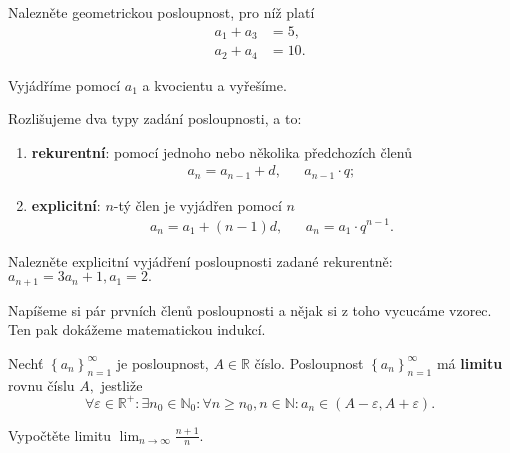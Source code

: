 \begin{priklad}
Nalezněte geometrickou posloupnost, pro níž platí
\begin{align*}
    a_1+a_3 &=5,\\
    a_2+a_4 &= 10.
\end{align*}
\end{priklad}

\begin{reseni}
Vyjádříme pomocí $a_1$ a kvocientu a vyřešíme.
\end{reseni}

\begin{pozn}
    Rozlišujeme dva typy zadání posloupnosti, a to:
    \begin{enumerate}[$i.$]
    \item \textbf{rekurentní}: pomocí jednoho nebo několika předchozích členů
    \begin{align*}
        a_n=a_{n-1}+d, & & a_{n-1}\cdot q;
    \end{align*}
   	\item \textbf{explicitní}: $n$-tý člen je vyjádřen pomocí $n$
    \begin{align*}
        a_n=a_1+(n-1)d, & & a_n = a_1\cdot q^{n-1}.
    \end{align*}
    \end{enumerate}
\end{pozn}

\begin{priklad}
Nalezněte explicitní vyjádření posloupnosti zadané rekurentně: $a_{n+1}=3a_n+1,a_1=2.$
\end{priklad}

\begin{reseni}
Napíšeme si pár prvních členů posloupnosti a nějak si z toho vycucáme vzorec. Ten
pak dokážeme matematickou indukcí.
\end{reseni}

\begin{definition}
Nechť $\left \{ a_n \right \}_{n=1}^\infty $ je posloupnost, $A\in \mathbb R$ číslo.
Posloupnost $\left \{ a_n \right \}_{n=1}^\infty $ má \textbf{limitu} rovnu číslu
$A,$ jestliže
$$\forall \varepsilon \in \mathbb R^+: \exists n_0 \in \mathbb N_0: \forall n \geq n_0,n \in \mathbb N: a_n\in(A-\varepsilon, A+\varepsilon).$$
\end{definition}

\begin{priklad}
Vypočtěte limitu $\lim_{n\to\infty}\frac{n+1}{n}.$
\end{priklad}


